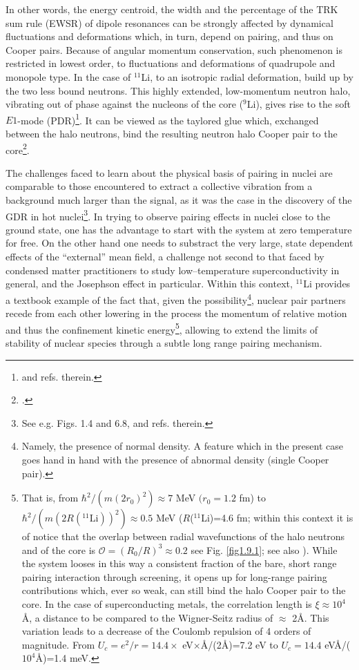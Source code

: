  In other words, the energy centroid, the width and the percentage of the TRK sum rule (EWSR) of dipole resonances can be strongly affected by dynamical fluctuations and deformations which, in turn, depend on pairing, and thus on Cooper pairs. Because of angular momentum conservation, such phenomenon is restricted in lowest order, to fluctuations and deformations of quadrupole and monopole type. In the case of $^{11}$Li, to an isotropic radial deformation, build up by the two less bound neutrons. This highly extended, low-momentum neutron halo, vibrating out of phase against the nucleons of the core ($^9$Li), gives rise to the soft $E1$-mode (PDR)\footnote{\cite{Broglia:19} and refs. therein.}.  It can be viewed as the taylored glue which, exchanged between the halo neutrons, bind the resulting neutron halo Cooper pair to the core\footnote{\cite{Barranco:01}.}.


The challenges faced to learn about the physical basis of pairing in nuclei are comparable to those encountered to extract a   collective vibration from a background much larger than the signal, as it was the case  in the discovery of the GDR in hot nuclei\footnote{See e.g. \cite{Bortignon:98} Figs. 1.4 and 6.8, and refs. therein.}. In trying to observe  pairing effects in nuclei close to the ground state, one has the advantage to start with the system at zero temperature for free. On the other hand one needs to substract the very large, state dependent effects of the ``external'' mean field, a challenge not second to that faced by condensed matter practitioners to study low--temperature superconductivity in general, and the Josephson effect in particular.  Within this context, $^{11}$Li provides a textbook example of the fact that, given the possibility\footnote{Namely, the presence of normal density. A feature which in the present case goes hand in hand with the presence of abnormal density (single Cooper pair).}, nuclear pair partners recede from each other lowering in the process the momentum of relative motion and thus the confinement kinetic energy\footnote{That is, from $\hbar^2/(m(2r_0)^2)\approx 7$ MeV $(r_0=1.2$ fm) to $\hbar^2/(m(2R(^{11}\text{Li}))^2)\approx 0.5$ MeV ($R$($^{11}$Li)=4.6 fm; within this context it is of notice that the overlap between radial wavefunctions of the halo neutrons and of the core is $\mathcal O=(R_0/R)^3\approx0.2$  see Fig. \ref{fig1.9.1}; see also \cite{Broglia:19b}). While the system looses in this way a consistent fraction of the bare, short range pairing interaction through screening, it opens up for long-range pairing contributions which, ever so weak, can still bind the halo Cooper pair to the core. In the case of superconducting metals, the correlation length is $\xi\approx 10^4$ \AA, a distance to be compared to the Wigner-Seitz radius of $\approx$ 2\AA. This variation leads to a decrease of the Coulomb repulsion of 4 orders of magnitude. From $U_c=e^2/r=14.4\times$ eV$\times$\AA/(2\AA)=7.2 eV to $U_c=14.4$ eV\AA/($10^4$\AA)=1.4 meV.}, allowing to extend the limits of stability of nuclear species through a subtle long range pairing mechanism. 


